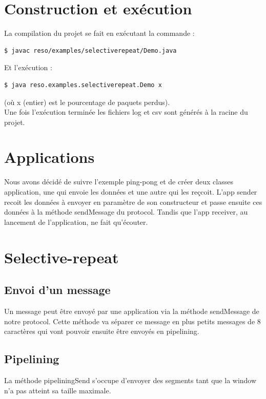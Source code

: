 \documentclass{article}
\begin{document}
\tableofcontents
\newpage


\section{Construction et exécution}

La compilation du projet se fait en exécutant la commande :
\begin{verbatim}
$ javac reso/examples/selectiverepeat/Demo.java
\end{verbatim}
Et l'exécution : 
\begin{verbatim}
$ java reso.examples.selectiverepeat.Demo x
\end{verbatim}
(où x (entier) est le pourcentage de paquets perdus).\\
Une fois l'exécution terminée les fichiers log et csv sont générés à la racine du projet.

\section{Applications}

Nous avons décidé de suivre l'exemple ping-pong et de créer deux classes application, une qui envoie les données et une autre qui les reçcoit.
L'app sender recoit les données à envoyer en paramètre de son constructeur et passe ensuite ces données à la méthode sendMessage du protocol. 
Tandis que l'app receiver, au lancement de l'application, ne fait qu'écouter.

\section{Selective-repeat}

\subsection{Envoi d'un message}

Un message peut être envoyé par une application via la méthode sendMessage de notre protocol. 
Cette méthode va séparer ce message en plus petits messages de 8 caractères qui vont pouvoir ensuite être envoyés en pipelining.

\subsection{Pipelining}

La méthode pipeliningSend s'occupe d'envoyer des segments tant que la window n'a pas atteint sa taille maximale.
\end{document}
